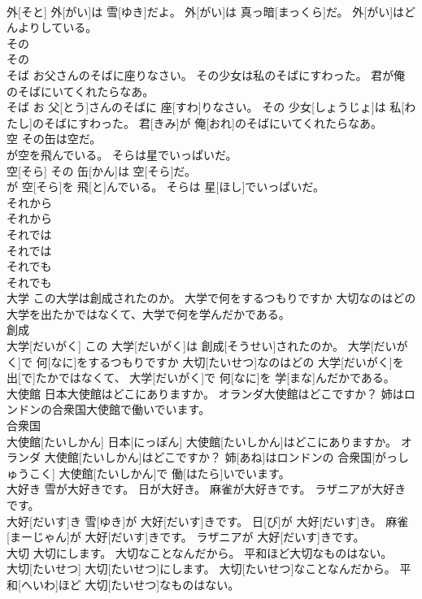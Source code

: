 \documentclass[8pt]{extreport}
\begin{document}
\begin{CJK}{UTF8}{min}
\\	外[そと] 外[がい]は 雪[ゆき]だよ。 外[がい]は 真っ暗[まっくら]だ。 外[がい]はどんよりしている。
\\	その	
\\	その
\\	そば お父さんのそばに座りなさい。 その少女は私のそばにすわった。 君が俺のそばにいてくれたらなあ。	
\\	そば お 父[とう]さんのそばに 座[すわ]りなさい。 その 少女[しょうじょ]は 私[わたし]のそばにすわった。 君[きみ]が 俺[おれ]のそばにいてくれたらなあ。
\\	空 その缶は空だ。 
\\	が空を飛んでいる。 そらは星でいっぱいだ。	
\\	空[そら] その 缶[かん]は 空[そら]だ。 
\\	が 空[そら]を 飛[と]んでいる。 そらは 星[ほし]でいっぱいだ。
\\	それから	
\\	それから
\\	それでは	
\\	それでは
\\	それでも	
\\	それでも
\\	大学 この大学は創成されたのか。 大学で何をするつもりですか 大切なのはどの大学を出たかではなくて、大学で何を学んだかである。	
\\	創成 
\\	大学[だいがく] この 大学[だいがく]は 創成[そうせい]されたのか。 大学[だいがく]で 何[なに]をするつもりですか 大切[たいせつ]なのはどの 大学[だいがく]を 出[で]たかではなくて、 大学[だいがく]で 何[なに]を 学[まな]んだかである。
\\	大使館 日本大使館はどこにありますか。 オランダ大使館はどこですか？ 姉はロンドンの合衆国大使館で働いでいます。	
\\	合衆国
\\	大使館[たいしかん] 日本[にっぽん] 大使館[たいしかん]はどこにありますか。 オランダ 大使館[たいしかん]はどこですか？ 姉[あね]はロンドンの 合衆国[がっしゅうこく] 大使館[たいしかん]で 働[はたら]いでいます。
\\	大好き 雪が大好きです。 日が大好き。 麻雀が大好きです。 ラザニアが大好きです。	
\\	大好[だいす]き 雪[ゆき]が 大好[だいす]きです。 日[び]が 大好[だいす]き。 麻雀[まーじゃん]が 大好[だいす]きです。 ラザニアが 大好[だいす]きです。
\\	大切 大切にします。 大切なことなんだから。 平和ほど大切なものはない。	
\\	大切[たいせつ] 大切[たいせつ]にします。 大切[たいせつ]なことなんだから。 平和[へいわ]ほど 大切[たいせつ]なものはない。

\end{CJK}
\end{document}
